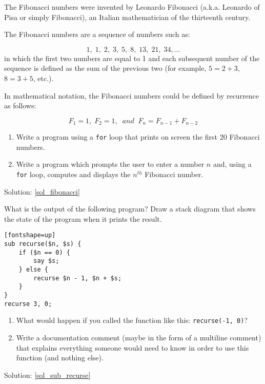 \begin{exercise} 
\label{fibonacci}
The Fibonacci numbers were invented by Leonardo Fibonacci 
(a.k.a. Leonardo of Pisa or simply Fibonacci), an Italian 
mathematician of the thirteenth century.

The Fibonacci numbers are a sequence of numbers such as:

\[1, \;1, \;2, \;3, \;5, \;8, \;13, \;21, \;34, \ldots\]
%
in which the first two numbers are equal to 1 and each 
subsequent number of the sequence is defined as the sum of 
the previous two (for example, $5 = 2 + 3$, $8 = 3 + 5$, etc.).

In mathematical notation, the Fibonacci numbers could be defined by recurrence as follows:

\[F_1 = 1, \;F_2 = 1, \;\;and\;\;  F_n = F_{n-1} + F_{n-2} \]
%
\begin{enumerate}

\item Write a program using a {\tt for} loop that prints on screen the first 20 Fibonacci numbers.

\item Write a program which prompts the user to enter a number 
$n$ and, using a {\tt for} loop, computes and displays the 
$n^{th}$ Fibonacci number.

\end{enumerate}

Solution: \ref{sol_fibonacci}


\end{exercise}

\begin{exercise}
\label{sub_recurse}

What is the output of the following program?
Draw a stack diagram that shows the state of the program
when it prints the result.

\begin{verbatim}[fontshape=up]
sub recurse($n, $s) {
    if ($n == 0) {
        say $s;
    } else {
        recurse $n - 1, $n + $s;
    }
}
recurse 3, 0;
\end{verbatim}

\begin{enumerate}

\item What would happen if you called the function like 
this: {\tt recurse(-1, 0)}?

\item Write a documentation comment (maybe in the form of a multiline comment) that explains everything someone would need to know in order to use this function (and nothing else).

\end{enumerate}

Solution: \ref{sol_sub_recurse}

\end{exercise}


